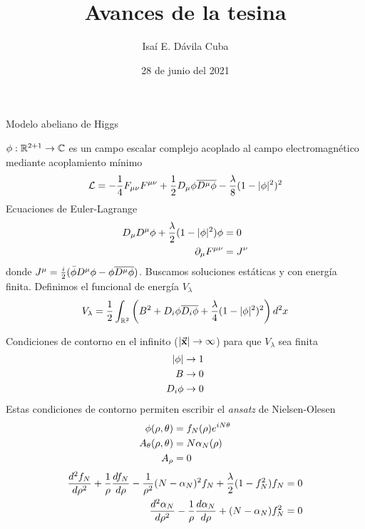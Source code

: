 \documentclass[11pt,t]{beamer}
\title{Avances de la tesina}
\author{Isaí E. Dávila Cuba}
\date{28 de junio del 2021}
\begin{document}
\begin{frame}
  \titlepage
\end{frame}

\begin{frame}{Modelo abeliano de Higgs}

$\phi:\mathbb{R}^{2+1}\rightarrow\mathbb{C}$ es un campo escalar complejo acoplado al campo electromagnético mediante acoplamiento mínimo
\begin{align}
    \mathcal{L} = -\frac{1}{4} F_{\mu\nu}F^{\mu\nu}+\frac{1}{2}D_\mu\phi\overline{D^\mu\phi}-\frac{\lambda}{8}(1-|\phi|^2)^2
\end{align}
Ecuaciones de Euler-Lagrange
\begin{align}
    D_\mu D^\mu\phi+\frac{\lambda}{2}(1-|\phi|^2)\phi &= 0\\
    \partial_\mu F^{\mu\nu} &= J^\nu
\end{align}
donde $J^\mu=\frac{i}{2}(\bar\phi D^\mu\phi-\phi\overline{D^\mu\phi})$.
Buscamos soluciones estáticas y con energía finita. Definimos el funcional de energía $V_\lambda$
\begin{align}
    V_\lambda = \frac{1}{2}\int_{\mathbb{R}^2}\left(B^2+D_i\phi\overline{D_i\phi}+\frac{\lambda}{4}(1-|\phi|^2)^2\right)d^2x
\end{align}

\end{frame}

\begin{frame}

Condiciones de contorno en el infinito ($|\vec{\mathbf{x}}|\rightarrow\infty$) para que $V_\lambda$ sea finita
\begin{align}
    |\phi|&\rightarrow 1\\
    B&\rightarrow 0\\
    D_i\phi &\rightarrow 0
\end{align}
Estas condiciones de contorno permiten escribir el \emph{ansatz} de Nielsen-Olesen
\begin{align}
    \phi(\rho,\theta) &= f_N(\rho)e^{iN\theta}\\
    A_\theta(\rho,\theta) &= N\alpha_N(\rho)\\
    A_\rho &= 0
\end{align}
\begin{align}
    \frac{d^2f_N}{d\rho^2}+\frac{1}{\rho}\frac{df_N}{d\rho}-\frac{1}{\rho^2}(N-\alpha_N)^2 f_N+\frac{\lambda}{2}(1-f_N^2)f_N &=0\\
    \frac{d^2\alpha_N}{d\rho^2}-\frac{1}{\rho}\frac{d\alpha_N}{d\rho}+(N-\alpha_N)f_N^2 &= 0
\end{align}
    
\end{frame}
\end{document}
